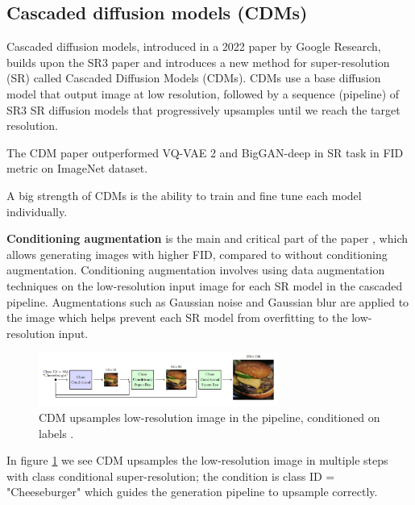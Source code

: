 \subsection{Cascaded diffusion models (CDMs)}

Cascaded diffusion models, introduced in a 2022 paper \cite{cascaded_diffusion_models} by Google Research, builds upon the SR3 paper \cite{sr3} and introduces a new method for super-resolution (SR) called Cascaded Diffusion Models (CDMs). CDMs use a base diffusion model that output image at low resolution, followed by a sequence (pipeline) of SR3 SR diffusion models that progressively upsamples until we reach the target resolution.

The CDM paper \cite{cascaded_diffusion_models} outperformed VQ-VAE 2 \cite{vqvae2} and BigGAN-deep \cite{biggan_deep} in SR task in FID metric on ImageNet dataset.

A big strength of CDMs is the ability to train and fine tune each model individually.

\textbf{Conditioning augmentation} is the main and critical part of the paper \cite{cascaded_diffusion_models}, which allows generating images with higher FID, compared to without conditioning augmentation. Conditioning augmentation involves using data augmentation techniques on the low-resolution input image for each SR model in the cascaded pipeline. Augmentations such as Gaussian noise and Gaussian blur are applied to the image which helps prevent each SR model from overfitting to the low-resolution input.

\begin{figure}
    \centering
    \includegraphics[width=0.7\textwidth]{images/imagen/cdm_architecture.png}
    \caption{CDM upsamples low-resolution image in the pipeline, conditioned on labels \cite{cascaded_diffusion_models}.}
    \label{fig:imagen_cdm_architecture}
\end{figure}

In figure \ref{fig:imagen_cdm_architecture} we see CDM upsamples the low-resolution image in multiple steps with class conditional super-resolution; the condition is class ID = "Cheeseburger" which guides the generation pipeline to upsample correctly.























